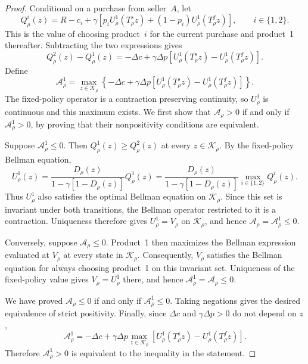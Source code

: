 \documentclass[11pt]{article}
\begin{document}
\begin{proof}
Conditional on a purchase from seller~$A$, let
\begin{equation*}
Q_\rho^i(z)
=R-c_i+\gamma\left[p_iU_\rho^1(T_\rho^s z)
+(1-p_i)U_\rho^1(T_\rho^f z)\right],
\qquad i\in\{1,2\}.
\end{equation*}
This is the value of choosing product~$i$ for the current purchase and
product~1 thereafter. Subtracting the two expressions gives
\begin{equation*}
Q_\rho^2(z)-Q_\rho^1(z)
=-\Delta c+\gamma\Delta p
\left[U_\rho^1(T_\rho^s z)-U_\rho^1(T_\rho^f z)\right].
\end{equation*}
Define
\begin{equation*}
\mathcal A_\rho^1
=\max_{z\in\mathcal K_\rho}
\left\{-\Delta c+\gamma\Delta p
\left[U_\rho^1(T_\rho^s z)-U_\rho^1(T_\rho^f z)\right]\right\}.
\end{equation*}
The fixed-policy operator is a contraction preserving continuity,
so $U_\rho^1$ is continuous and this maximum exists.
We first show that $\mathcal A_\rho>0$ if and only if
$\mathcal A_\rho^1>0$, by proving that their nonpositivity conditions
are equivalent.

Suppose $\mathcal A_\rho^1\leq0$. Then
$ Q_\rho^1(z)\geq Q_\rho^2(z)$ at every
$z\in\mathcal K_\rho$. By the fixed-policy Bellman equation,
\begin{equation*}
U_\rho^1(z)
=\frac{D_\rho(z)}{1-\gamma[1-D_\rho(z)]}Q_\rho^1(z)
=\frac{D_\rho(z)}{1-\gamma[1-D_\rho(z)]}
\max_{i\in\{1,2\}} Q_\rho^i(z).
\end{equation*}
Thus $U_\rho^1$ also satisfies the optimal Bellman equation on
$\mathcal K_\rho$. Since this set is invariant under both transitions,
the Bellman operator restricted to it is a contraction. Uniqueness
therefore gives $U_\rho^1=V_\rho$ on $\mathcal K_\rho$, and hence
$\mathcal A_\rho=\mathcal A_\rho^1\leq0$.

Conversely, suppose $\mathcal A_\rho\leq0$. Product~1 then maximizes
the Bellman expression evaluated at $V_\rho$ at every state in
$\mathcal K_\rho$. Consequently, $V_\rho$ satisfies the Bellman equation
for always choosing product~1 on this invariant set. Uniqueness of
the fixed-policy value gives $V_\rho=U_\rho^1$ there, and hence
$\mathcal A_\rho^1=\mathcal A_\rho\leq0$.

We have proved $\mathcal A_\rho\leq0$ if and only if
$\mathcal A_\rho^1\leq0$. Taking negations gives the desired equivalence
of strict positivity. Finally, since $\Delta c$ and $\gamma\Delta p>0$
do not depend on $z$,
\begin{equation*}
\mathcal A_\rho^1
=-\Delta c+\gamma\Delta p\max_{z\in\mathcal K_\rho}
\left[U_\rho^1(T_\rho^s z)-U_\rho^1(T_\rho^f z)\right].
\end{equation*}
Therefore $\mathcal A_\rho^1>0$ is equivalent to the inequality
in the statement.
\end{proof}
\end{document}
